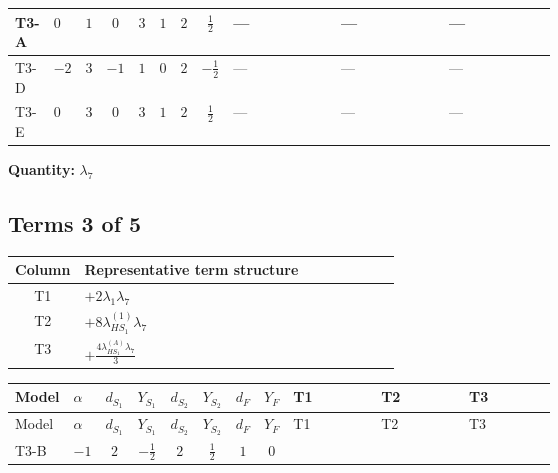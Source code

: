 \documentclass[8pt]{article}
\begin{document}
\begin{landscape}
\begin{longtable}{@{}llcccccc >{\raggedright\arraybackslash}p{0.21\linewidth} >{\raggedright\arraybackslash}p{0.21\linewidth} >{\raggedright\arraybackslash}p{0.21\linewidth}@{}}
\midrule
T3-A & $0$ & $1$ & $0$ & $3$ & $1$ & $2$ & $\frac{1}{2}$ & --- & --- & --- \\
\midrule
T3-D & $-2$ & $3$ & $-1$ & $1$ & $0$ & $2$ & $-\frac{1}{2}$ & --- & --- & --- \\
\midrule
T3-E & $0$ & $3$ & $0$ & $3$ & $1$ & $2$ & $\frac{1}{2}$ & --- & --- & --- \\
\midrule
\bottomrule
\end{longtable}
\clearpage
\noindent\textbf{Quantity: }$\lambda_{7}$\par\smallskip
\subsection*{Terms 3 of 5}
\begin{center}
\begin{tabular}{@{}c >{\raggedright\arraybackslash}p{0.82\linewidth}@{}}
\toprule
Column & Representative term structure \\
\midrule
T1 & \(\displaystyle +2 {\lambda_1} {\lambda_{7}}\) \\
\midrule
T2 & \(\displaystyle +8 {\lambda_{HS_1}^{(1)}} {\lambda_{7}}\) \\
\midrule
T3 & \(\displaystyle +\frac{4 {\lambda_{HS_1}^{(A)}} {\lambda_{7}}}{3}\) \\
\midrule
\bottomrule
\end{tabular}
\end{center}
\smallskip
\tiny
\begin{longtable}{@{}llcccccc >{\raggedright\arraybackslash}p{0.21\linewidth} >{\raggedright\arraybackslash}p{0.21\linewidth} >{\raggedright\arraybackslash}p{0.21\linewidth}@{}}
\toprule
Model & $\alpha$ & $d_{S_1}$ & $Y_{S_1}$ & $d_{S_2}$ & $Y_{S_2}$ & $d_F$ & $Y_F$ & T1 & T2 & T3 \\
\midrule
\endfirsthead
\toprule
Model & $\alpha$ & $d_{S_1}$ & $Y_{S_1}$ & $d_{S_2}$ & $Y_{S_2}$ & $d_F$ & $Y_F$ & T1 & T2 & T3 \\
\midrule
\endhead
T3-B & $-1$ & $2$ & $-\frac{1}{2}$ & $2$ & $\frac{1}{2}$ & $1$ & $0$ & \scriptsize\adjustbox{max width=\linewidth}{$\begin{gathered} +2 {\lambda_1} {\lambda_{7}}\end{gathered}$} & \scriptsize\adjustbox{max width=\linewidth}{$\begin{gathered} +8 {\lambda_{HS_1}^{(1)}} {\lambda_{7}}\end{gathered}$} & \scriptsize\adjustbox{max width=\linewidth}{$\begin{gathered} +\frac{4 {\lambda_{HS_1}^{(A)}} {\lambda_{7}}}{3}\end{gathered}$} \\

\end{longtable}
\end{landscape}
\end{document}
